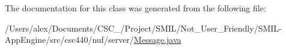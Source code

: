 The documentation for this class was generated from the following file\-:\begin{DoxyCompactItemize}
\item 
/\-Users/alex/\-Documents/\-C\-S\-C\-\_/\-Project/\-S\-M\-I\-L/\-Not\-\_\-\-User\-\_\-\-Friendly/\-S\-M\-I\-L-\/\-App\-Engine/src/csc440/nuf/server/\hyperlink{_message_8java}{Message.\-java}\end{DoxyCompactItemize}
